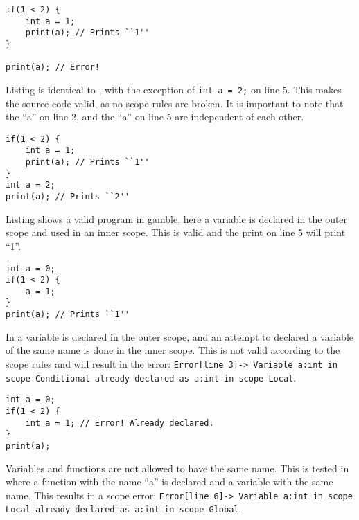 \begin{lstlisting}[caption={Example of a scope error in \gls{gamble}},label={lst:scope1},frame=tb]
if(1 < 2) {
    int a = 1;
    print(a); // Prints ``1''
}

print(a); // Error!
\end{lstlisting}

Listing  is identical to , with the exception of \texttt{int a = 2;} on line 5. 
This makes the source code valid, as no scope rules are broken.
It is important to note that the ``a'' on line 2, and the ``a'' on line 5 are independent of each other.  

\begin{lstlisting}[caption={Example of a valid program in \gls{gamble}},label={lst:scope2},frame=tb]
if(1 < 2) {
    int a = 1;
    print(a); // Prints ``1''
}
int a = 2;
print(a); // Prints ``2''
\end{lstlisting}

Listing  shows a valid program in \gls{gamble}, here a variable is declared in the outer scope and used in an inner scope. 
This is valid and the print on line 5 will print ``1''.

\begin{lstlisting}[caption={Example of a valid program in \gls{gamble}},label={lst:scope3},frame=tb]
int a = 0;
if(1 < 2) {
    a = 1;
}
print(a); // Prints ``1''
\end{lstlisting}

In  a variable is declared in the outer scope, and an attempt to declared a variable of the same name is done in the inner scope. 
This is not valid according to the scope rules and will result in the error: \texttt{Error[line    3]-> Variable a:int in scope Conditional already declared as a:int in scope Local}.

\begin{lstlisting}[caption={Example of a redeclaration error in \gls{gamble}},label={lst:scope4},frame=tb]
int a = 0;
if(1 < 2) {
    int a = 1; // Error! Already declared.
}
print(a); 
\end{lstlisting}

Variables and functions are not allowed to have the same name.
This is tested in  where a function with the name ``a'' is declared and a variable with the same name. 
This results in a scope error: \texttt{Error[line    6]-> Variable a:int in scope Local already declared as a:int in scope Global}.

